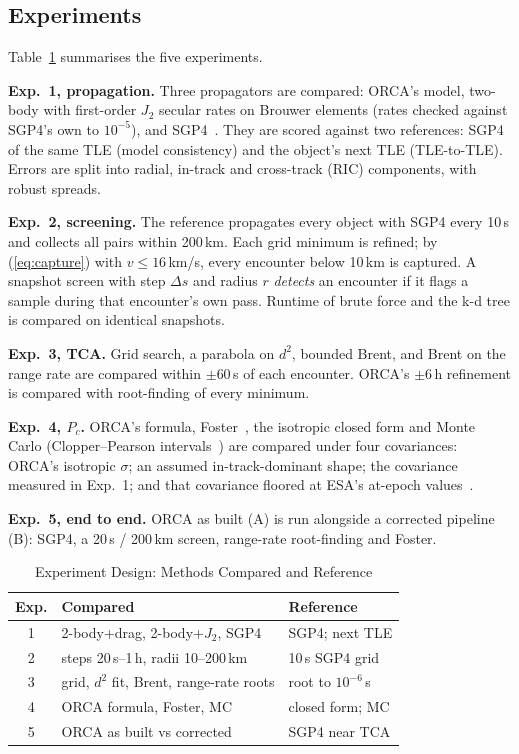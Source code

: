 \documentclass[conference]{IEEEtran}
\begin{document}
\subsection{Experiments}
Table~\ref{tab:exp} summarises the five experiments.

\textbf{Exp.~1, propagation.} Three propagators are compared: ORCA's model, two-body with first-order $J_2$ secular rates on Brouwer elements (rates checked against SGP4's own to $10^{-5}$), and SGP4~\cite{rhodes_sgp4}. They are scored against two references: SGP4 of the same TLE (model consistency) and the object's next TLE (TLE-to-TLE). Errors are split into radial, in-track and cross-track (RIC) components, with robust spreads.

\textbf{Exp.~2, screening.} The reference propagates every object with SGP4 every 10\,s and collects all pairs within 200\,km. Each grid minimum is refined; by (\ref{eq:capture}) with $v\le16$\,km/s, every encounter below 10\,km is captured. A snapshot screen with step $\Delta s$ and radius $r$ \emph{detects} an encounter if it flags a sample during that encounter's own pass. Runtime of brute force and the k-d tree is compared on identical snapshots.

\textbf{Exp.~3, TCA.} Grid search, a parabola on $d^2$, bounded Brent, and Brent on the range rate are compared within $\pm60$\,s of each encounter. ORCA's $\pm6$\,h refinement is compared with root-finding of every minimum.

\textbf{Exp.~4, $P_c$.} ORCA's formula, Foster~\cite{foster1992}, the isotropic closed form and Monte Carlo (Clopper--Pearson intervals~\cite{clopper1934}) are compared under four covariances: ORCA's isotropic $\sigma$; an assumed in-track-dominant shape; the covariance measured in Exp.~1; and that covariance floored at ESA's at-epoch values~\cite{flohrer2009improving}.

\textbf{Exp.~5, end to end.} ORCA as built (A) is run alongside a corrected pipeline (B): SGP4, a 20\,s / 200\,km screen, range-rate root-finding and Foster.

\begin{table}[t]
\caption{Experiment Design: Methods Compared and Reference}
\label{tab:exp}
\centering
\footnotesize
\begin{tabular}{|c|l|l|}
\hline
\textbf{Exp.} & \textbf{Compared} & \textbf{Reference}\\
\hline
1 & 2-body+drag, 2-body+$J_2$, SGP4 & SGP4; next TLE\\
\hline
2 & steps 20\,s--1\,h, radii 10--200\,km & 10\,s SGP4 grid\\
\hline
3 & grid, $d^2$ fit, Brent, range-rate roots & root to $10^{-6}$\,s\\
\hline
4 & ORCA formula, Foster, MC & closed form; MC\\
\hline
5 & ORCA as built vs corrected & SGP4 near TCA\\
\hline
\end{tabular}
\end{table}
\end{document}
